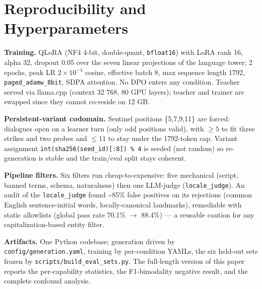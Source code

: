 \section{Reproducibility and
Hyperparameters}\label{reproducibility-and-hyperparameters}

\textbf{Training.} QLoRA \citep{dettmers2023qlora} (NF4 4-bit,
double-quant, \texttt{bfloat16}) with LoRA \citep{hu2022lora} rank 16,
alpha 32, dropout 0.05 over the seven linear projections of the language
tower; 2 epochs, peak LR \(2\times10^{-4}\) cosine, effective batch 8,
max sequence length 1792, \texttt{paged\_adamw\_8bit}, SDPA attention.
No DPO enters any condition. Teacher served via llama.cpp (context 32
768, 80 GPU layers); teacher and trainer are swapped since they cannot
co-reside on 12 GB.

\textbf{Persistent-variant codomain.} Sentinel positions \{5,7,9,11\}
are forced: dialogues open on a learner turn (only odd positions valid),
with \(\geq 5\) to fit three strikes and two probes and \(\leq 11\) to
stay under the 1792-token cap. Variant assignment
\texttt{int(sha256(seed\_id){[}:8{]})\ \%\ 4} is seeded (not random) so
re-generation is stable and the train/eval split stays coherent.

\textbf{Pipeline filters.} Six filters run cheap-to-expensive: five
mechanical (script, banned terms, schema, naturalness) then one
LLM-judge (\texttt{locale\_judge}). An audit of the
\texttt{locale\_judge} found \textasciitilde85\% false positives on its
rejections (common English sentence-initial words, locally-canonical
landmarks), remediable with static allowlists (global pass rate 70.1\%
\(\to\) 88.4\%) --- a reusable caution for any capitalization-based
entity filter.

\textbf{Artifacts.} One Python codebase; generation driven by
\texttt{config/generation.yaml}, training by per-condition YAMLs, the
six held-out sets frozen by \texttt{scripts/build\_eval\_sets.py}. The
full-length version of this paper reports the per-capability statistics,
the F1-bimodality negative result, and the complete confound analysis.
